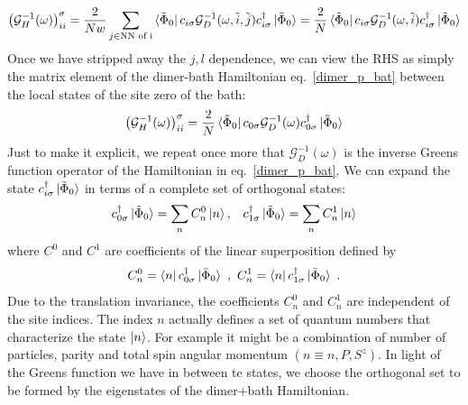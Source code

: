 \documentclass{report}
\numberwithin{equation}{section}
\begin{document}
\begin{gather}
	\left(\mathcal{G}_{H}^{-1}(\omega)\right)_{ii}^\sigma = \frac{2}{Nw}\sum_{j \in \text{NN of i}}\bra{\tilde \Phi_0}c_{i\sigma}\mathcal{G}_{D}^{-1}(\omega, \tilde i, \tilde j)c^\dagger_{i\sigma}\ket{\tilde \Phi_0} = \frac{2}{N}\bra{\tilde \Phi_0}c_{i\sigma}\mathcal{G}_{D}^{-1}(\omega, \tilde i)c^\dagger_{i\sigma}\ket{\tilde \Phi_0}
\end{gather}
Once we have stripped away the \(j,l\) dependence, we can view the RHS as simply the matrix element of the dimer-bath Hamiltonian eq.~\ref{dimer_p_bat} between the local states of the site zero of the bath:
\begin{gather}
	\label{local_gf}
	\left(\mathcal{G}_{H}^{-1}(\omega)\right)_{ii}^\sigma = \frac{2}{N}\bra{\tilde \Phi_0}c_{0\sigma}\mathcal{G}_{D}^{-1}(\omega)c^\dagger_{0\sigma}\ket{\tilde \Phi_0}
\end{gather}
Just to make it explicit, we repeat once more that \(\mathcal{G}_{D}^{-1}(\omega)\) is the inverse Greens function operator of the Hamiltonian in eq.~\ref{dimer_p_bat}.
We can expand the state $c^\dagger_{i\sigma}\ket{\tilde \Phi_0}$ in terms of a complete set of orthogonal states:
\begin{equation}\begin{aligned}
	c^\dagger_{0\sigma}\ket{\tilde \Phi_0} = \sum_n C^0_n \ket{n}, && c^\dagger_{1\sigma}\ket{\tilde \Phi_0} = \sum_n C^1_n \ket{n}
\end{aligned}\end{equation}
where $C^{0}$ and $C^{1}$ are coefficients of the linear superposition defined by
\begin{equation}
C^{0}_{n} = \bra{n} c^\dagger_{0\sigma}\ket{\tilde \Phi_0}~,~ C^{1}_{n} = \bra{n} c^\dagger_{1\sigma}\ket{\tilde \Phi_0}~.
\end{equation}
Due to the translation invariance, the coefficients $C^{0}_{n}$ and $C^{1}_{n}$ are independent of the site indices. The index $n$ actually defines a set of quantum numbers that characterize the state $\ket{n}$. For example it might be a combination of number of particles, parity and total spin angular momentum $(n \equiv n, P, S^z)$. In light of the Greens function we have in between te states, we choose the orthogonal set to be formed by the eigenstates of the dimer+bath Hamiltonian.
\end{document}
